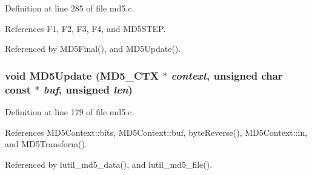 Definition at line 285 of file md5.c.

References F1, F2, F3, F4, and MD5STEP.

Referenced by MD5Final(), and MD5Update().
\subsubsection{\setlength{\rightskip}{0pt plus 5cm}void MD5Update ({\bf MD5\_\-CTX} $\ast$ {\em context}, unsigned char const $\ast$ {\em buf}, unsigned {\em len})\hspace{0.3cm}{\tt  [static]}}\label{md5_8c_a6}




Definition at line 179 of file md5.c.

References MD5Context::bits, MD5Context::buf, byte\-Reverse(), MD5Context::in, and MD5Transform().

Referenced by lutil\_\-md5\_\-data(), and lutil\_\-md5\_\-file().